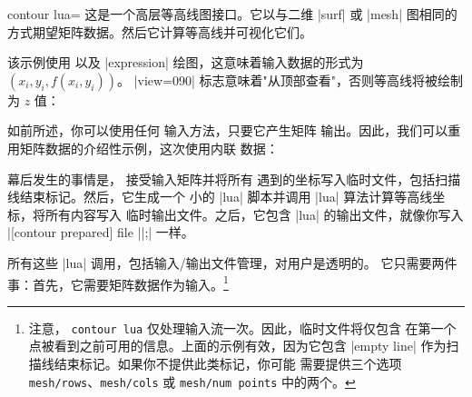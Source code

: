 {{\begin{plottype}[/pgfplots]{
    contour lua=\textcolor{black}{}%
}
    这是一个高层等高线图接口。它以与二维 |surf| 或 |mesh| 图相同的
    方式期望矩阵数据。然后它计算等高线并可视化它们。
\pgfplotsexpensiveexample
\begin{codeexample}[]
\end{codeexample}
    \noindent 该示例使用  以及 |expression|
    绘图，这意味着输入数据的形式为 $(x_i,y_i,f(x_i,y_i))$。
    |view={0}{90}| 标志意味着"从顶部查看"，否则等高线将被绘制为
    $z$ 值：
%
\pgfplotsexpensiveexample
\begin{codeexample}[]
\end{codeexample}

    如前所述，你可以使用任何 \PGFPlots{} 输入方法，只要它产生矩阵
    输出。因此，我们可以重用矩阵数据的介绍性示例，这次使用内联
    数据：
\pgfplotsexpensiveexample
\begin{codeexample}[]
\end{codeexample}
    \noindent 幕后发生的事情是，\PGFPlots{} 接受输入矩阵并将所有
    遇到的坐标写入临时文件，包括扫描线结束标记。然后，它生成一个
    小的 |lua| 脚本并调用 |lua| 算法计算等高线坐标，将所有内容写入
    临时输出文件。之后，它包含 |lua| 的输出文件，就像你写入
    |[contour prepared] file ||;| 一样。

    所有这些 |lua| 调用，包括输入/输出文件管理，对用户是透明的。
    它只需要两件事：首先，它需要矩阵数据作为输入。\footnote{注意，
    \texttt{contour lua} 仅处理输入流一次。因此，临时文件将仅包含
    在第一个点被看到之前可用的信息。上面的示例有效，因为它包含
    |empty line| 作为扫描线结束标记。如果你不提供此类标记，你可能
    需要提供三个选项 \texttt{mesh/rows}、\texttt{mesh/cols} 或
    \texttt{mesh/num points} 中的两个。}


\end{plottype}}}
